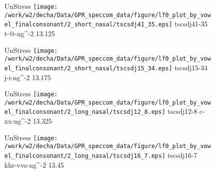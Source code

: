 \documentclass{article}
\begin{document}
\begin{figure}[t]
\begin{minipage}[b]{.24\textwidth}
UnStress
\centering
\texttt{[image: /work/w2/decha/Data/GPR\_speccom\_data/figure/lf0\_plot\_by\_vowel\_finalconsonant/2\_short\_nasal/tscsdj41\_35.eps]}
tscsdj41-35 t-@-ng\textasciicircum-2 13.125
\end{minipage}
\begin{minipage}[b]{.24\textwidth}
UnStress
\centering
\texttt{[image: /work/w2/decha/Data/GPR\_speccom\_data/figure/lf0\_plot\_by\_vowel\_finalconsonant/2\_short\_nasal/tscsdj15\_34.eps]}
tscsdj15-34 j-i-ng\textasciicircum-2 13.175
\end{minipage}
\begin{minipage}[b]{.24\textwidth}
UnStress
\centering
\texttt{[image: /work/w2/decha/Data/GPR\_speccom\_data/figure/lf0\_plot\_by\_vowel\_finalconsonant/2\_long\_nasal/tscsdj12\_8.eps]}
tscsdj12-8 c-xx-ng\textasciicircum-2 13.325
\end{minipage}
\begin{minipage}[b]{.24\textwidth}
UnStress
\centering
\texttt{[image: /work/w2/decha/Data/GPR\_speccom\_data/figure/lf0\_plot\_by\_vowel\_finalconsonant/2\_long\_nasal/tscsdj16\_7.eps]}
tscsdj16-7 khr-vva-ng\textasciicircum-2 13.45
\end{minipage}
\end{figure}
\end{document}
